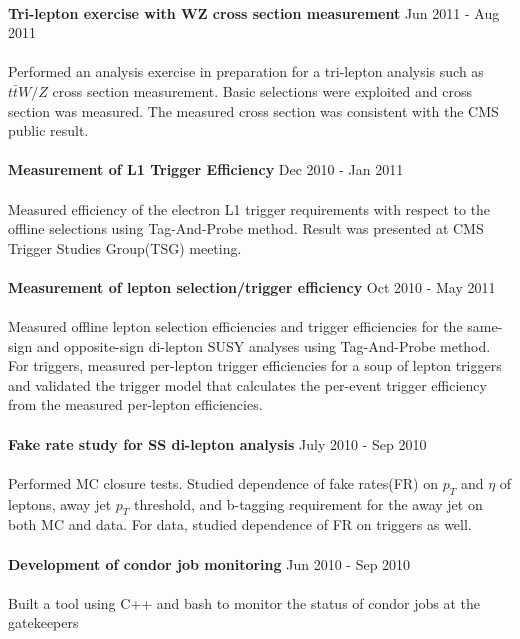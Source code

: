 \documentclass[margin]{res}
\begin{document}
\begin{resume}
     \\                
\textbf{Tri-lepton exercise with WZ cross section measurement} 
        \hfill Jun 2011 - Aug 2011 
     \\
     \\
     Performed an analysis exercise in preparation for a tri-lepton analysis such as $t\bar{t}W/Z$ 
     cross section measurement. Basic selections were exploited and cross section was measured.
     The measured cross section was consistent with the CMS public result. 
     \\
     \\
\textbf{Measurement of L1 Trigger Efficiency}  
        \hfill Dec 2010 - Jan 2011 
     \\
     \\
     Measured efficiency of the electron L1 trigger requirements
     with respect to the offline selections using Tag-And-Probe method. Result was presented at 
     CMS Trigger Studies Group(TSG) meeting.  
     \\
     \\
\textbf{Measurement of lepton selection/trigger efficiency} 
        \hfill Oct 2010 - May 2011 
     \\
     \\
     Measured offline lepton selection efficiencies and trigger efficiencies for 
     the same-sign and opposite-sign di-lepton SUSY analyses using Tag-And-Probe method. 
     For triggers, measured per-lepton trigger efficiencies for a soup of lepton triggers 
     and validated the trigger model that calculates the per-event trigger efficiency 
     from the measured per-lepton efficiencies. 
     \\
     \\
\textbf{Fake rate study for SS di-lepton analysis}
      \hfill{July 2010 - Sep 2010} 
     \\
     \\
     Performed MC closure tests. Studied dependence of fake rates(FR) on 
     $p_T$ and $\eta$ of leptons, away jet $p_T$ threshold, and b-tagging requirement for the away jet
     on both MC and data. For data, studied dependence of FR on triggers as well.  
     \\
     \\
\textbf{Development of condor job monitoring}
      \hfill{Jun 2010 - Sep 2010} 
     \\
     \\
     Built a tool using C++ and bash to monitor the status of condor jobs at the gatekeepers 

\end{resume}
\end{document}
